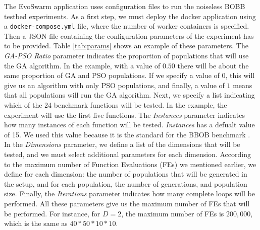 \documentclass[review]{elsarticle}
\begin{document}
The EvoSwarm application uses configuration files to run the noiseless BOBB testbed
experiments.  As a first step, we must deploy the docker application using a
{\tt docker-compose.yml} file, where the number of worker containers is
specified. Then a JSON file containing the configuration parameters of the
experiment has to be provided.  Table \ref{tab:params} shows an example of these
parameters. The { \em GA-PSO Ratio} parameter indicates the proportion of
populations that will use the GA algorithm.  In the example, with a value of
$0.50$ there will be about the same proportion of GA and PSO populations. If we
specify a value of $0$, this will give us an algorithm with only PSO
populations, and finally, a value of  $1$ means that all populations will run
the GA algorithm. Next, we specify a list indicating which of the 24 benchmark
functions will be tested. In the example, the experiment will use the first five
functions.  The {\em Instances} parameter indicates how many instances of each
function will be tested. {\em Instances}  has a defualt value of 15. We used this
value because it is the standard for the BBOB benchmark \cite{hansen2016coco}.
In the {\em Dimensions} parameter, we define a list of the dimensions that will
be tested, and we must select additional parameters for each dimension.
According to the maximum number of  Function Evaluations (FEs) we mentioned
earlier, we define for each dimension: the number of populations that will be
generated in the setup, and for each population,  the number of generations, and
population size. Finally, the {\em Iterations} parameter indicates how many
complete loops will be performed. All these parameters give us the maximum
number of FEs that will be performed. For instance, for $D = 2$, the maximum
number of FEs is $200,000$, which is the same as $40*50*10*10$.
\end{document}
